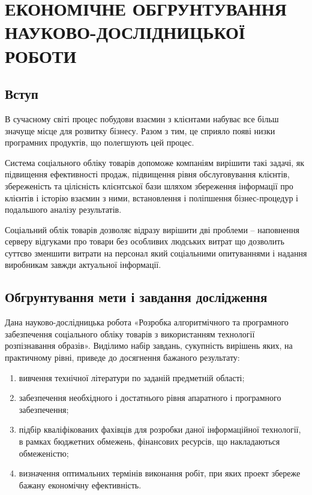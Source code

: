 ﻿\section{ЕКОНОМІЧНЕ ОБГРУНТУВАННЯ НАУКОВО-ДОСЛІДНИЦЬКОЇ РОБОТИ}
    \subsection{Вступ}

В сучасному світі процес побудови взаємин з клієнтами набуває все більш значуще місце для розвитку бізнесу. Разом з тим, це сприяло появі низки програмних продуктів, що полегшують цей процес.

Система соціального обліку товарів допоможе компаніям вирішити такі задачі, як підвищення ефективності продаж, підвищення рівня обслуговування клієнтів, збереженість та цілісність клієнтської бази шляхом збереження інформації про клієнтів і історію взаємин з ними, встановлення і поліпшення бізнес-процедур і подальшого аналізу результатів.

Соціальний облік товарів дозволяє відразу вирішити дві проблеми – наповнення серверу відгуками про товари без особливих людських витрат що дозволить суттєво зменшити витрати на персонал який соціальними опитуваннями і надання виробникам завжди актуальної інформації. 

\subsection{Обгрунтування мети і завдання дослідження}
Дана науково-дослідницька робота «Розробка алгоритмічного та програмного забезпечення соціального обліку товарів з використанням технології розпізнавання образів».
Виділимо набір завдань, сукупність вирішень яких, на практичному рівні, приведе до досягнення бажаного результату:

\begin{enumerate}
\item вивчення технічної літератури по заданій предметній області;
\item забезпечення необхідного і достатнього рівня апаратного і програмного забезпечення;
\item підбір кваліфікованих фахівців для розробки даної інформаційної технології, в рамках бюджетних обмежень, фінансових ресурсів, що накладаються обмеженістю;
\item визначення оптимальних термінів виконання робіт, при яких проект збереже бажану економічну ефективність.
\end{enumerate}

